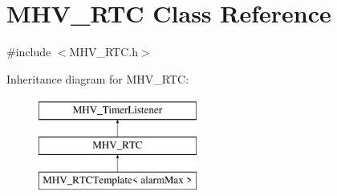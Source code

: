 \hypertarget{class_m_h_v___r_t_c}{\section{M\-H\-V\-\_\-\-R\-T\-C Class Reference}
\label{class_m_h_v___r_t_c}
}


{\ttfamily \#include $<$M\-H\-V\-\_\-\-R\-T\-C.\-h$>$}

Inheritance diagram for M\-H\-V\-\_\-\-R\-T\-C\-:\begin{figure}[H]
\begin{center}
\leavevmode
\includegraphics[height=3.000000cm]{class_m_h_v___r_t_c}
\end{center}
\end{figure}
